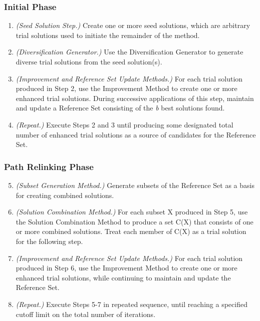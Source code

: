 \subsubsection{Initial Phase}
\begin{enumerate}
\item \textit{(Seed Solution Step.)}
  Create one or more seed solutions,
  which are
  arbitrary trial solutions
  used to
  initiate
  the remainder of the method.
\item \textit{(Diversification Generator.)}
  Use the Diversification Generator
  to generate
  diverse trial solutions
  from the seed solution(s).
\item \textit{(Improvement and Reference Set Update Methods.)}
  For each trial solution
  produced in Step 2,
  use the Improvement Method
  to create one or more enhanced trial solutions.
  During successive applications of this step,
  maintain and update
  a Reference Set
  consisting of the \textit{b} best solutions found.
\item \textit{(Repeat.)}
  Execute Steps 2 and 3
  until
  producing some designated
  total number of enhanced trial solutions
  as a source of candidates
  for the Reference Set.
\end{enumerate}

\subsubsection{Path Relinking Phase}
\begin{enumerate}
  \setcounter{enumi}{4}
\item \textit{(Subset Generation Method.)}
  Generate subsets of the Reference Set
  as a basis for creating combined solutions.
\item \textit{(Solution Combination Method.)}
  For each subset X produced in Step 5,
  use the Solution Combination Method
  to produce a set C(X)
  that consists
  of one or more combined solutions.
  Treat each member of C(X)
  as a trial solution
  for the following step.
\item \textit{(Improvement and Reference Set Update Methods.)}
  For each trial solution produced in Step 6,
  use the Improvement Method
  to create one or more enhanced trial solutions,
  while continuing
  to maintain and update the Reference Set.
\item \textit{(Repeat.)}
  Execute Steps 5-7 in repeated sequence,
  until
  reaching a specified cutoff limit
  on the total number of iterations.
\end{enumerate}
